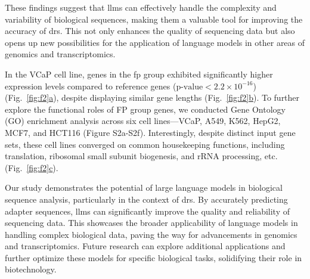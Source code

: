 \documentclass[pdflatex, sn-mathphys-num, lineno]{sn-jnl}%
\newcommand{\figref}[2]{Fig.~\hyperref[#1]{\ref*{#1}#2}}
\theoremstyle{thmstyleone}%
\theoremstyle{thmstyletwo}%
\theoremstyle{thmstylethree}%
\begin{document}
These findings suggest that \glspl{llm} can effectively handle the complexity and variability of biological sequences, making them a valuable tool for improving the accuracy of \gls{drs}.
This not only enhances the quality of sequencing data but also opens up new possibilities for the application of language models in other areas of genomics and transcriptomics.



In the VCaP cell line, genes in the \gls{fp} group exhibited significantly higher expression levels compared to reference genes (\(\textrm{p-value} < 2.2 \times 10^{-16}\)) (\figref{fig:f2}{a}), despite displaying similar gene lengths (\figref{fig:f2}{b}).
To further explore the functional roles of FP group genes, we conducted Gene Ontology (GO) enrichment analysis across six cell lines—VCaP, A549, K562, HepG2, MCF7, and HCT116 (Figure S2a-S2f).
Interestingly, despite distinct input gene sets, these cell lines converged on common housekeeping functions, including translation, ribosomal small subunit biogenesis, and rRNA processing, etc. (\figref{fig:f2}{c}).

Our study demonstrates the potential of large language models in biological sequence analysis, particularly in the context of \gls{drs}.
By accurately predicting adapter sequences,  \glspl{llm} can significantly improve the quality and reliability of sequencing data.
This showcases the broader applicability of language models in handling complex biological data, paving the way for advancements in genomics and transcriptomics.
Future research can explore additional applications and further optimize these models for specific biological tasks, solidifying their role in biotechnology.
\end{document}
